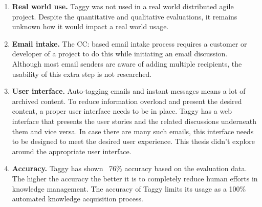 \begin{enumerate}
	\item \textbf{Real world use.} Taggy was not used in a real world distributed agile project. Despite the quantitative and qualitative evaluations, it remains unknown how it would impact a real world usage.
	\item \textbf{Email intake.} The CC: based email intake process requires a customer or developer of a project to do this while initiating an email discussion. Although most email senders are aware of adding multiple recipients, the usability of this extra step is not researched.
	\item \textbf{User interface.} Auto-tagging emails and instant messages means a lot of archived content. To reduce information overload and present the desired content, a proper user interface needs to be in place. Taggy has a web interface that presents the user stories and the related discussions underneath them and vice versa. In case there are many such emails, this interface needs to be designed to meet the desired user experience. This thesis didn't explore around the appropriate user interface.
	\item \textbf{Accuracy.} Taggy has shown ~76\% accuracy based on the evaluation data. The higher the accuracy the better it is to completely reduce human efforts in knowledge management. The accuracy of Taggy limits its usage as a 100\% automated knowledge acquisition process.
\end{enumerate}







